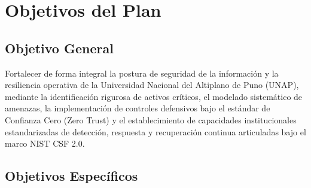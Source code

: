 \clearpage
\enlargethispage{2\baselineskip}
\section{Objetivos del Plan}

\subsection{Objetivo General}

Fortalecer de forma integral la postura de seguridad de la información y la resiliencia operativa de la Universidad Nacional del Altiplano de Puno (UNAP), mediante la identificación rigurosa de activos críticos, el modelado sistemático de amenazas, la implementación de controles defensivos bajo el estándar de Confianza Cero (Zero Trust) y el establecimiento de capacidades institucionales estandarizadas de detección, respuesta y recuperación continua articuladas bajo el marco NIST CSF 2.0.

\subsection{Objetivos Específicos}

